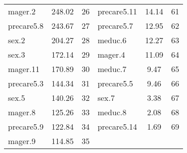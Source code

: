 \begin{table}[htbp]
\begin{tabular}{lcr|lcr}
mager.2 & 248.02 & 26 & precare5.11 & 14.14 & 61 \\
precare5.8 & 243.67 & 27 & precare5.7 & 12.95 & 62 \\
sex.2 & 204.27 & 28 & meduc.6 & 12.27 & 63 \\
sex.3 & 172.14 & 29 & mager.4 & 11.09 & 64 \\
mager.11 & 170.89 & 30 & meduc.7 & 9.47 & 65 \\
precare5.3 & 144.34 & 31 & precare5.5 & 9.46 & 66 \\
sex.5 & 140.26 & 32 & sex.7 & 3.38 & 67 \\
mager.8 & 125.26 & 33 & meduc.8 & 2.08 & 68 \\
precare5.9 & 122.84 & 34 & precare5.14 & 1.69 & 69 \\
mager.9 & 114.85 & 35 & & & \\
\hline
\end{tabular}
\end{table}
\endgroup
